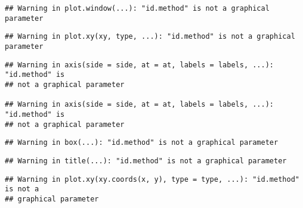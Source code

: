 \documentclass[]{article}
\newenvironment{Shaded}{\begin{snugshade}}{\end{snugshade}}
\newcommand{\KeywordTok}[1]{\textcolor[rgb]{0.13,0.29,0.53}{\textbf{#1}}}
\newcommand{\DataTypeTok}[1]{\textcolor[rgb]{0.13,0.29,0.53}{#1}}
\newcommand{\DecValTok}[1]{\textcolor[rgb]{0.00,0.00,0.81}{#1}}
\newcommand{\StringTok}[1]{\textcolor[rgb]{0.31,0.60,0.02}{#1}}
\newcommand{\CommentTok}[1]{\textcolor[rgb]{0.56,0.35,0.01}{\textit{#1}}}
\newcommand{\OperatorTok}[1]{\textcolor[rgb]{0.81,0.36,0.00}{\textbf{#1}}}
\newcommand{\NormalTok}[1]{#1}
\begin{document}
\begin{Shaded}
\end{Shaded}

\begin{verbatim}
## Warning in plot.window(...): "id.method" is not a graphical parameter
\end{verbatim}

\begin{verbatim}
## Warning in plot.xy(xy, type, ...): "id.method" is not a graphical parameter
\end{verbatim}

\begin{verbatim}
## Warning in axis(side = side, at = at, labels = labels, ...): "id.method" is
## not a graphical parameter

## Warning in axis(side = side, at = at, labels = labels, ...): "id.method" is
## not a graphical parameter
\end{verbatim}

\begin{verbatim}
## Warning in box(...): "id.method" is not a graphical parameter
\end{verbatim}

\begin{verbatim}
## Warning in title(...): "id.method" is not a graphical parameter
\end{verbatim}

\begin{verbatim}
## Warning in plot.xy(xy.coords(x, y), type = type, ...): "id.method" is not a
## graphical parameter
\end{verbatim}
\end{document}
